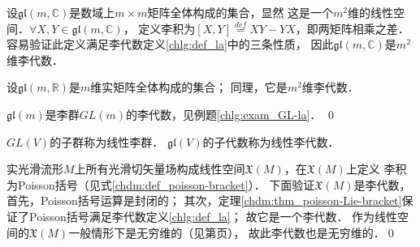 \begin{example}\label{chlg:exm_GL-a}
    设$\mathfrak{gl}(m,\mathbb{C})$是数域上$m\times m$矩阵全体构成的集合，显然
    这是一个$m^2$维的线性空间．$\forall X,Y\in \mathfrak{gl}(m,\mathbb{C})$，
    定义李积为$[X,Y]\overset{def}{=}XY-YX$，即两矩阵相乘之差．
    容易验证此定义满足李代数定义\ref{chlg:def_la}中的三条性质，
    因此$\mathfrak{gl}(m,\mathbb{C})$是$m^2$维李代数．
    
    设$\mathfrak{gl}(m,\mathbb{R})$是$m$维实矩阵全体构成的集合；
    同理，它是$m^2$维李代数．
    
    $\mathfrak{gl}(m)$是李群$GL(m)$的李代数，见例题\ref{chlg:exam_GL-la}． \qed
\end{example}


 
\begin{definition}
    $GL(V)$的子群称为{\heiti 线性李群}．
    $\mathfrak{gl}(V)$的子代数称为{\heiti 线性李代数}．
\end{definition}

\begin{example}\label{chlg:exm_LAXM}
    实光滑流形$M$上所有光滑切矢量场构成线性空间$\mathfrak{X}(M)$，在$\mathfrak{X}(M)$上定义
    李积为Poisson括号（见式\eqref{chdm:def_poisson-bracket}）．
    下面验证$\mathfrak{X}(M)$是李代数，首先，Poisson括号运算是封闭的；
    其次，定理\ref{chdm:thm_poisson-Lie-bracket}保证了Poisson括号满足李代数定义\ref{chlg:def_la}；
    故它是一个李代数．
    作为线性空间的$\mathfrak{X}(M)$一般情形下是无穷维的（见第\pageref{chdm:eqn_rnumtimesv}页），
    故此李代数也是无穷维的．\qed
\end{example}






